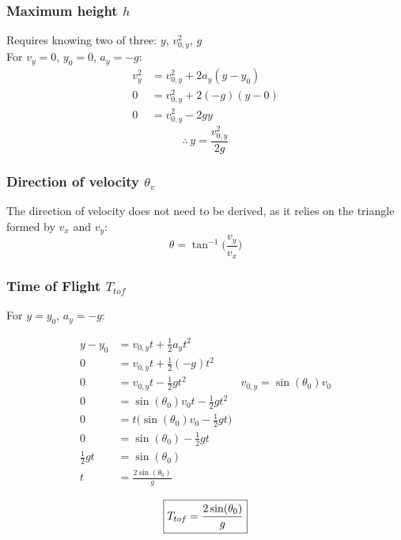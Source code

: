 \documentclass{article}
\numberwithin{equation}{section}
\begin{document}
 \subsubsection{Maximum height $h$}
 Requires knowing two of three: $y$, $v_{0,y}^2$, $g$\\
 For $v_{y}=0$, $y_{0}=0$, $a_{y} = -g$:
\[
  \begin{aligned}
    v_{y}^2 &= v_{0,y}^2 + 2a_{y}(y - y_{0}) \\
    0 &= v_{0,y}^2 + 2(-g)(y - 0) \\
    0 &= v_{0,y}^2 - 2gy
  \end{aligned}
\]
\begin{equation}\label{eq:projh}
  \therefore \, \boxed{y = \frac{v_{0,y}^2}{2g}}
\end{equation}

 \subsubsection{Direction of velocity $\theta_v$}
 The direction of velocity does not need to be derived, as it relies on the
 triangle formed by $v_x$ and $v_y$:
 \begin{equation}\label{eq:launchangle}
   \theta = \tan^{-1} \bigg( \frac{v_y}{v_x} \bigg)
 \end{equation}
 \subsubsection{Time of Flight $T_{tof}$}
 For $y=y_{0}$, $a_{y} = -g$:
 
\[
  \begin{aligned}
    y - y_{0} &= v_{0,y}t + \frac{1}{2}a_{y}t^2 \\
    0 &= v_{0,y}t + \frac{1}{2}(-g)t^2 \\
    0 &= v_{0,y}t - \frac{1}{2}gt^2 & v_{0,y} = \sin(\theta_{0})v_{0}\\
    0 &= \sin(\theta_0)v_{0}t -\frac{1}{2}gt^2 \\
    0 &= t \bigg( \sin(\theta_0)v_{0} -\frac{1}{2}gt \bigg) \\
    0 &= \sin(\theta_{0}) - \frac{1}{2}gt \\
    \frac{1}{2}gt &= \sin(\theta_{0}) \\
    t &= \frac{2\sin(\theta_{0})}{g} \\
  \end{aligned}
\]
\begin{equation}\label{eq:tof}
   \boxed{    T_{tof} = \frac{2\sin(\theta_{0})}{g} \\}
 \end{equation}
\end{document}
